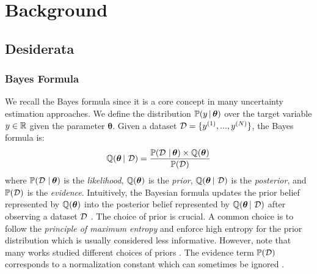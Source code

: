 \chapter{Background}
\label{chap:background}

\section{Desiderata}

\subsection{Bayes Formula} We recall the Bayes formula since it is a core concept in many uncertainty estimation approaches.
We define the distribution $\mathbb{P}(y \,|\, \bm{\theta})$ over the target variable $y \in \operatorname{\mathbb{R}}$ given the parameter $\bm{\theta}$.
Given a dataset $\operatorname{\mathcal{D}}=\{y^{(1)}, ..., y^{(N)}\}$, the Bayes formula is:
\begin{equation}
    \operatorname{\mathbb{Q}}(\bm{\theta} \,|\, \operatorname{\mathcal{D}}) = \frac{\mathbb{P}(\operatorname{\mathcal{D}} \,|\, \bm{\theta}) \times \operatorname{\mathbb{Q}}(\bm{\theta})}{\mathbb{P}(\operatorname{\mathcal{D}})}
\end{equation}
where $\mathbb{P}(\operatorname{\mathcal{D}} \,|\, \bm{\theta})$ is the \emph{likelihood}, $\operatorname{\mathbb{Q}}(\bm{\theta})$ is the \emph{prior}, $\operatorname{\mathbb{Q}}(\bm{\theta} \,|\, \operatorname{\mathcal{D}})$ is the \emph{posterior}, and $\mathbb{P}(\operatorname{\mathcal{D}})$ is the \emph{evidence}.
Intuitively, the Bayesian formula updates the prior belief represented by $\operatorname{\mathbb{Q}}(\bm{\theta})$ into the posterior belief represented by $\operatorname{\mathbb{Q}}(\bm{\theta} \,|\, \operatorname{\mathcal{D}})$ after observing a dataset $\operatorname{\mathcal{D}}$ \cite{bishop}.
The choice of prior is crucial. A common choice is to follow the \emph{principle of maximum entropy} \citep{maximum-entropy-principle} and enforce high entropy for the prior distribution which is usually considered less informative. However, note that many works studied different choices of priors \cite{jeffreys1946prior, silvestro2020prior}.
The evidence term $\mathbb{P}(\operatorname{\mathcal{D}})$ corresponds to a normalization constant which can sometimes be ignored \cite{bishop}.


